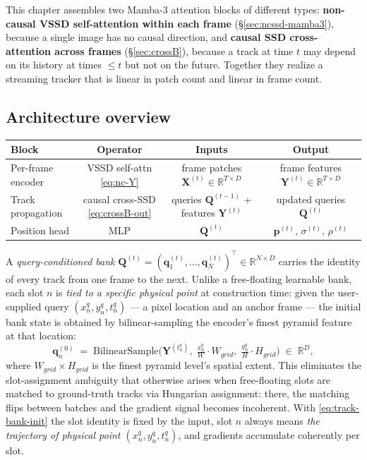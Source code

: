 \documentclass[11pt,a4paper]{article}
\begin{document}
This chapter assembles two Mamba-3 attention blocks of different types:
\textbf{non-causal VSSD self-attention within each frame} (\S\ref{sec:ncssd-mamba3}),
because a single image has no causal direction, and
\textbf{causal SSD cross-attention across frames} (\S\ref{sec:crossB}),
because a track at time $t$ may depend on its history at times
$\le t$ but not on the future. Together they realize a streaming
tracker that is linear in patch count and linear in frame count.

\subsection{Architecture overview}
\label{sec:track-arch}

\begin{center}\small
\begin{tabular}{|l|c|c|c|}
\hline
Block & Operator & Inputs & Output \\ \hline
Per-frame encoder
  & VSSD self-attn \eqref{eq:nc-Y}
  & frame patches $\bm{X}^{(t)}\in\mathbb{R}^{T\times D}$
  & frame features $\bm{Y}^{(t)}\in\mathbb{R}^{T\times D}$ \\ \hline
Track propagation
  & causal cross-SSD \eqref{eq:crossB-out}
  & queries $\bm{Q}^{(t-1)}$ + features $\bm{Y}^{(t)}$
  & updated queries $\bm{Q}^{(t)}$ \\ \hline
Position head
  & MLP
  & $\bm{Q}^{(t)}$
  & $\bm{p}^{(t)},\,\sigma^{(t)},\,\rho^{(t)}$ \\ \hline
\end{tabular}
\end{center}

A \emph{query-conditioned bank}
$\bm{Q}^{(t)} = (\bm{q}_1^{(t)},\dots,\bm{q}_N^{(t)})^\top
\in\mathbb{R}^{N\times D}$ carries the identity of every track from
one frame to the next. Unlike a free-floating learnable bank, each
slot $n$ is \emph{tied to a specific physical point} at construction
time: given the user-supplied query
$(x_n^{q}, y_n^{q}, t_n^{q})$ — a pixel location and an anchor frame
— the initial bank state is obtained by bilinear-sampling the
encoder's finest pyramid feature at that location:
\begin{equation}\label{eq:track-bank-init}
  \bm{q}_n^{(0)} \;=\; \mathrm{BilinearSample}\!\bigl(
    \bm{Y}^{(t_n^{q})},\; \tfrac{x_n^{q}}{W}\cdot W_{\!grid},\;
                          \tfrac{y_n^{q}}{H}\cdot H_{\!grid}\bigr)
  \;\in\; \mathbb{R}^{D},
\end{equation}
where $W_{\!grid}\times H_{\!grid}$ is the finest pyramid level's
spatial extent. This eliminates the slot-assignment ambiguity that
otherwise arises when free-floating slots are matched to ground-truth
tracks via Hungarian assignment: there, the matching flips between
batches and the gradient signal becomes incoherent. With
\eqref{eq:track-bank-init} the slot identity is fixed by the input,
slot $n$ always means \emph{the trajectory of physical point
$(x_n^{q}, y_n^{q}, t_n^{q})$}, and gradients accumulate coherently
per slot.
\end{document}
